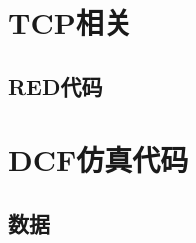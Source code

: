 \documentclass{article}
\begin{document}
\appendix
\section{TCP相关}

\subsection {\bf RED代码}


\section{DCF仿真代码}
\subsection{数据}
\end{document}
